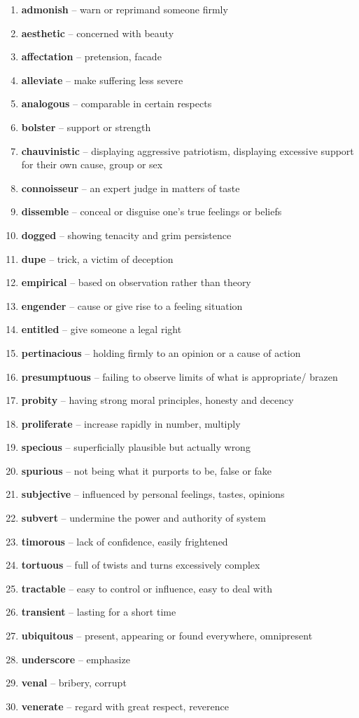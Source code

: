 \begin{enumerate}[wide,labelindent=0pt]
\item \textbf{admonish} -- warn or reprimand someone firmly
\item \textbf{aesthetic} -- concerned with beauty
\item \textbf{affectation} -- pretension, facade
\item \textbf{alleviate} -- make suffering less severe
\item \textbf{analogous} -- comparable in certain respects
\item \textbf{bolster} -- support or strength
\item \textbf{chauvinistic} -- displaying aggressive patriotism, displaying excessive support for their own cause, group or sex
\item \textbf{connoisseur} -- an expert judge in matters of taste
\item \textbf{dissemble} -- conceal or disguise one's true feelings or beliefs
\item \textbf{dogged} -- showing tenacity and grim persistence
\item \textbf{dupe} -- trick, a victim of deception
\item \textbf{empirical} -- based on observation rather than theory
\item \textbf{engender} -- cause or give rise to a feeling situation
\item \textbf{entitled} -- give someone a legal right
\item \textbf{pertinacious} -- holding firmly to an opinion or a cause of action
\item \textbf{presumptuous} -- failing to observe limits of what is appropriate/ brazen
\item \textbf{probity} -- having strong moral principles, honesty and decency
\item \textbf{proliferate} -- increase rapidly in number, multiply
\item \textbf{specious} -- superficially plausible but actually wrong
\item \textbf{spurious} -- not being what it purports to be, false or fake
\item \textbf{subjective} -- influenced by personal feelings, tastes, opinions
\item \textbf{subvert} -- undermine the power and authority of system
\item \textbf{timorous} -- lack of confidence, easily frightened
\item \textbf{tortuous} -- full of twists and turns excessively complex
\item \textbf{tractable} -- easy to control or influence, easy to deal with
\item \textbf{transient} -- lasting for a short time
\item \textbf{ubiquitous} -- present, appearing or found everywhere, omnipresent
\item \textbf{underscore} -- emphasize
\item \textbf{venal} -- bribery, corrupt
\item \textbf{venerate} -- regard with great respect, reverence
\end{enumerate}

